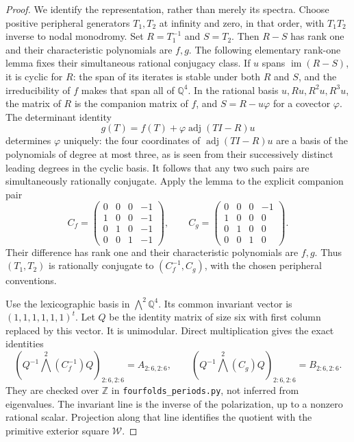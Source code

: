 \begin{proof}
We identify the representation, rather than merely its spectra.
Choose positive peripheral generators $T_1,T_2$ at infinity and
zero, in that order, with $T_1T_2$ inverse to nodal monodromy.
Set $R=T_1^{-1}$ and $S=T_2$.  Then $R-S$ has rank one and their
characteristic polynomials are $f,g$.  The following elementary
rank-one lemma fixes their simultaneous rational conjugacy class.
If $u$ spans $\operatorname{im}(R-S)$, it is cyclic for $R$:
the span of its iterates is stable under both $R$ and $S$, and
the irreducibility of $f$ makes that span all of $\mathbb Q^4$.
In the rational basis $u,Ru,R^2u,R^3u$, the matrix of $R$ is
the companion matrix of $f$, and $S=R-u\varphi$ for a covector
$\varphi$.  The determinant identity
\[
 g(T)=f(T)+\varphi\operatorname{adj}(TI-R)u
 \tag{F.9}
\]
determines $\varphi$ uniquely: the four coordinates of
$\operatorname{adj}(TI-R)u$ are a basis of the polynomials of
degree at most three, as is seen from their successively distinct
leading degrees in the cyclic basis.  It follows that any two
such pairs are simultaneously rationally conjugate.  Apply the
lemma to the explicit companion pair
\[
 C_f=\begin{pmatrix}
 0&0&0&-1\\1&0&0&-1\\0&1&0&-1\\0&0&1&-1
 \end{pmatrix},\qquad
 C_g=\begin{pmatrix}
 0&0&0&-1\\1&0&0&0\\0&1&0&0\\0&0&1&0
 \end{pmatrix}.
 \tag{F.10}
\]
Their difference has rank one and their characteristic polynomials
are $f,g$.  Thus $(T_1,T_2)$ is rationally conjugate to
$(C_f^{-1},C_g)$, with the chosen peripheral conventions.

Use the lexicographic basis in $\bigwedge^2\mathbb Q^4$.
Its common invariant vector is $(1,1,1,1,1,1)^t$.
Let $Q$ be the identity matrix of size six with first column
replaced by this vector.  It is unimodular.  Direct multiplication
gives the exact identities
\[
 \left(Q^{-1}\bigwedge^2(C_f^{-1})Q\right)_{2:6,2:6}
   =A_{2:6,2:6},\qquad
 \left(Q^{-1}\bigwedge^2(C_g)Q\right)_{2:6,2:6}
   =B_{2:6,2:6}.
 \tag{F.11}
\]
They are checked over $\mathbb Z$ in
\texttt{fourfolds\_periods.py}, not inferred from eigenvalues.
The invariant line is the inverse of the polarization, up to a
nonzero rational scalar.  Projection along that line identifies
the quotient with the primitive exterior square $\mathcal W$.


\end{proof}
